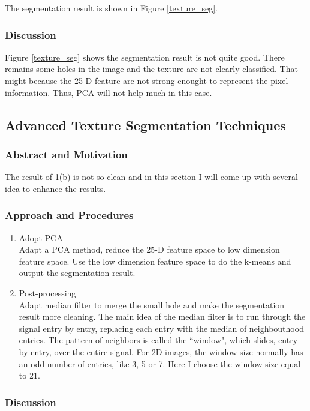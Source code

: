\documentclass[11pt]{article}
\begin{document}
The segmentation result is shown in Figure \ref{texture_seg}.

\subsubsection{Discussion}

Figure \ref{texture_seg} shows the segmentation result is not quite good. There remains some holes in the image and the texture are not clearly classified. That might because the 25-D feature are not strong enought to represent the pixel information. Thus, PCA will not help much in this case.


\subsection{Advanced Texture Segmentation Techniques}
\subsubsection{Abstract and Motivation}
The result of 1(b) is not so clean and in this section I will come up with several idea to enhance the results.
\subsubsection{Approach and Procedures}
\begin{enumerate}
\item Adopt PCA \\
Adapt a PCA method, reduce the 25-D feature space to low dimension feature space. Use the low dimension feature space to do the k-means and output the segmentation result.
\item Post-processing \\
Adapt median filter to merge the small hole and make the segmentation result more cleaning.  The main idea of the median filter is to run through the signal entry by entry, replacing each entry with the median of neighbouthood entries. The pattern of neighbors is called the ``window", which slides, entry by entry, over the entire signal. For 2D images, the window size normally has an odd number of entries, like 3, 5 or 7. Here I choose the window size equal to 21. 

\end{enumerate} 

	
\subsubsection{Discussion}
\end{document}
